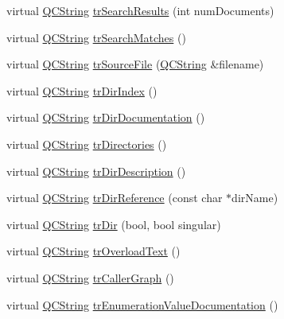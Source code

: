 \begin{DoxyCompactItemize}
\item 
virtual \mbox{\hyperlink{class_q_c_string}{Q\+C\+String}} \mbox{\hyperlink{class_translator_ukrainian_ac6dc51752a73dc442ff061d0b1fc24f9}{tr\+Search\+Results}} (int num\+Documents)
\item 
virtual \mbox{\hyperlink{class_q_c_string}{Q\+C\+String}} \mbox{\hyperlink{class_translator_ukrainian_ab8f943013cbf8a2e81bdf51d81e48f3b}{tr\+Search\+Matches}} ()
\item 
virtual \mbox{\hyperlink{class_q_c_string}{Q\+C\+String}} \mbox{\hyperlink{class_translator_ukrainian_aec640e3c7bc9db35db62c2b2e3a00c5b}{tr\+Source\+File}} (\mbox{\hyperlink{class_q_c_string}{Q\+C\+String}} \&filename)
\item 
virtual \mbox{\hyperlink{class_q_c_string}{Q\+C\+String}} \mbox{\hyperlink{class_translator_ukrainian_aef569512f61552361990065648b15d10}{tr\+Dir\+Index}} ()
\item 
virtual \mbox{\hyperlink{class_q_c_string}{Q\+C\+String}} \mbox{\hyperlink{class_translator_ukrainian_a7b89c731c6b93688846799891b2d9529}{tr\+Dir\+Documentation}} ()
\item 
virtual \mbox{\hyperlink{class_q_c_string}{Q\+C\+String}} \mbox{\hyperlink{class_translator_ukrainian_ac75e514ec56fb37ee24ac8064128860a}{tr\+Directories}} ()
\item 
virtual \mbox{\hyperlink{class_q_c_string}{Q\+C\+String}} \mbox{\hyperlink{class_translator_ukrainian_a6acbb67a336a734ecac4257e0f0b8ccd}{tr\+Dir\+Description}} ()
\item 
virtual \mbox{\hyperlink{class_q_c_string}{Q\+C\+String}} \mbox{\hyperlink{class_translator_ukrainian_ab72a2205f1684a9a9b5907c52a3e7eff}{tr\+Dir\+Reference}} (const char $\ast$dir\+Name)
\item 
virtual \mbox{\hyperlink{class_q_c_string}{Q\+C\+String}} \mbox{\hyperlink{class_translator_ukrainian_a01f332ff6918c2cc3c51d08fa098049e}{tr\+Dir}} (bool, bool singular)
\item 
virtual \mbox{\hyperlink{class_q_c_string}{Q\+C\+String}} \mbox{\hyperlink{class_translator_ukrainian_a1328697f3b6775bb87f0230e5930fd4b}{tr\+Overload\+Text}} ()
\item 
virtual \mbox{\hyperlink{class_q_c_string}{Q\+C\+String}} \mbox{\hyperlink{class_translator_ukrainian_a0a3e38a59461b3681f256178125fc943}{tr\+Caller\+Graph}} ()
\item 
virtual \mbox{\hyperlink{class_q_c_string}{Q\+C\+String}} \mbox{\hyperlink{class_translator_ukrainian_a44f81c1379feda3765e0f3aab42f7b44}{tr\+Enumeration\+Value\+Documentation}} ()

\end{DoxyCompactItemize}
